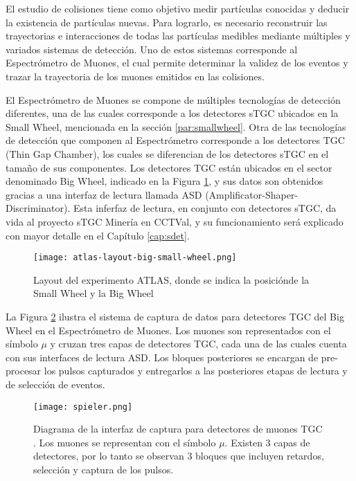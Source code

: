 	El estudio de colisiones tiene como objetivo medir partículas conocidas y deducir la existencia de partículas nuevas. Para lograrlo, es necesario reconstruir las trayectorias e interacciones de todas las partículas medibles mediante múltiples y variados sistemas de detección. Uno de estos sistemas corresponde al Espectrómetro de Muones\cite{Pontecorvo2004TheSpectrometer}, el cual permite determinar la validez de los eventos y trazar la trayectoria de los muones emitidos en las colisiones. 
	
	El Espectrómetro de Muones se compone de múltiples tecnologías de detección diferentes, una de las cuales corresponde a los detectores sTGC ubicados en la Small Wheel, mencionada en la sección \ref{par:smallwheel}. Otra de las tecnologías de detección que componen al Espectrómetro corresponde a los detectores TGC (Thin Gap Chamber), los cuales se diferencian de los detectores sTGC en el tamaño de sus componentes. Los detectores TGC están ubicados en el sector denominado Big Wheel, indicado en la Figura \ref{fig:both-wheels}, y sus datos son obtenidos gracias a una interfaz de lectura llamada ASD (Amplificator-Shaper-Discriminator). Esta inferfaz de lectura, en conjunto con detectores sTGC, da vida al proyecto sTGC Minería en CCTVal, y su funcionamiento será explicado con mayor detalle en el Capítulo \ref{cap:sdet}.
	
	\begin{figure}[h]
		\centering
		\texttt{[image: atlas-layout-big-small-wheel.png]} 
		\caption{Layout del experimento ATLAS, donde se indica la posiciónde la Small Wheel y la Big Wheel\cite{Formenti2018CERNReport}}
		\label{fig:both-wheels}
	\end{figure}
	
	La Figura \ref{fig:spieler} ilustra el sistema de captura de datos para detectores TGC del Big Wheel en el Espectrómetro de Muones. Los muones son representados con el símbolo $\mu$ y cruzan tres capas de detectores TGC, cada una de las cuales cuenta con sus interfaces de lectura ASD. Los bloques posteriores se encargan de pre-procesar los pulsos capturados y entregarlos a las posteriores etapas de lectura y de selección de eventos.
	
	\begin{figure}[h]
		\centering
		\texttt{[image: spieler.png]}
		\caption{Diagrama de la interfaz de captura para detectores de muones TGC \cite{Spieler2012ElectronicsAcquisition}. Los muones se representan con el símbolo $\mu$. Existen 3 capas de detectores, por lo tanto se observan 3 bloques que incluyen retardos, selección y captura de los pulsos.}
		\label{fig:spieler}
	\end{figure}


